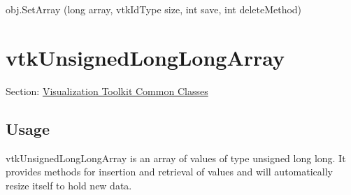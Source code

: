 \begin{DoxyItemize}
\item {\ttfamily obj.\-Set\-Array (long array, vtk\-Id\-Type size, int save, int delete\-Method)}  
\end{DoxyItemize}\hypertarget{vtkcommon_vtkunsignedlonglongarray}{}\section{vtk\-Unsigned\-Long\-Long\-Array}\label{vtkcommon_vtkunsignedlonglongarray}
Section\-: \hyperlink{sec_vtkcommon}{Visualization Toolkit Common Classes} \hypertarget{vtkwidgets_vtkxyplotwidget_Usage}{}\subsection{Usage}\label{vtkwidgets_vtkxyplotwidget_Usage}
vtk\-Unsigned\-Long\-Long\-Array is an array of values of type unsigned long long. It provides methods for insertion and retrieval of values and will automatically resize itself to hold new data.

